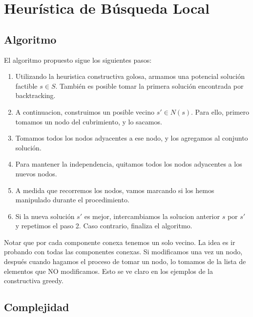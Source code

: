 \section{Heurística de Búsqueda Local}

\subsection{Algoritmo}

El algoritmo propuesto sigue los siguientes pasos:

\begin{enumerate}
\item Utilizando la heuristica constructiva golosa, armamos una potencial solución factible $s \in S$. También es posible tomar la primera solución encontrada por backtracking.
\item A continuacion, construimos un posible vecino $s' \in N(s)$. Para ello, primero tomamos un nodo del cubrimiento, y lo sacamos.
\item Tomamos todos los nodos adyacentes a ese nodo, y los agregamos al conjunto solución.
\item Para mantener la independencia, quitamos todos los nodos adyacentes a los nuevos nodos.
\item A medida que recorremos los nodos, vamos marcando si los hemos manipulado durante el procedimiento.
\item Si la nueva solución $s'$ es mejor, intercambiamos la solucion anterior $s$ por $s'$ y repetimos el paso 2. Caso contrario, finaliza el algoritmo.
\end{enumerate}

Notar que por cada componente conexa tenemos un solo vecino. La idea es ir probando con todas las componentes conexas. Si modificamos una vez un nodo, después cuando hagamos el proceso de tomar un nodo, lo tomamos de la lista de elementos que NO modificamos. Esto se ve claro en los ejemplos de la constructiva greedy.

\subsection{Complejidad}
